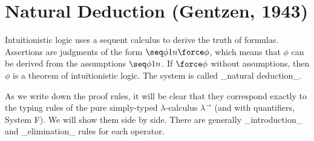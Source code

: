 \section{Natural Deduction (Gentzen, 1943)}

Intuitionistic logic uses a sequent calculus to derive the truth of formulas.  Assertions are judgments of the form $\seq\phi 1n\force\phi$, which means that $\phi$ can be derived from the assumptions $\seq\phi 1n$. If $\force\phi$ without assumptions, then $\phi$ is a theorem of intuitionistic logic.  The system is called _natural deduction_.

As we write down the proof rules, it will be clear that they correspond exactly to the typing rules of the pure simply-typed $\lambda$-calculus $\lambda^\to$ (and with quantifiers, System F).  We will show them side by side.  There are generally _introduction_ and _elimination_ rules for each operator.
